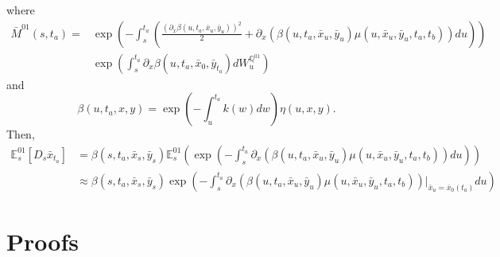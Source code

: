 \documentclass[a4paper,10pt]{article}
\newcommand{\1}{\mathbf{1}}
\begin{document}
where
\begin{align*}
\bar{M}^{01}(s,t_a) = &\exp\left(-\int_{s}^{t_a} \left(\frac{\left(\partial_x \beta(u,t_a,\bar{x}_u,\bar{y}_{u})\right)^{2}}{2} + \partial_x (\beta(u,t_a,\bar{x}_u,\bar{y}_{u}) \mu(u,\bar{x}_u,\bar{y}_u,t_a,t_b)) du \right)\right) \\
&\exp\left(\int_{s}^{t_a} \partial_x \beta(u,t_a,\bar{x}_0,\bar{y}_{t_a}) dW^{\mathbb{Q}^{01}}_u \right)
\end{align*}
and 
\begin{equation*}
\beta(u,t_a,x,y) = \exp\left(-\int_{u}^{t_a}k(w) dw\right)\eta(u,x,y).
\end{equation*}
Then, 
\begin{align}\label{approximation_E_01_Ds_x_t}
\mathbb{E}^{01}_s\left[D_s \bar{x}_{t_a}\right] &= \beta(s,t_a,\bar{x}_s,\bar{y}_s)  \mathbb{E}_s^{01}\left(\exp\left(-\int_{s}^{t_a}\partial_x (\beta(u,t_a,\bar{x}_u,\bar{y}_u) \mu(u,\bar{x}_u, \bar{y}_u,t_a,t_b)) du \right)\right) \nonumber \\
&\approx \beta(s,t_a,\bar{x}_s,\bar{y}_s) \exp\left(-\int_{s}^{t_a}\partial_x (\beta(u,t_a,\bar{x}_u,\bar{y}_u) \mu(u,\bar{x}_u, \bar{y}_u,t_a,t_b))|_{\bar{x}_u=\bar{x}_{0}(t_a)}  du \right)
\end{align}

\section{Proofs}
\end{document}
